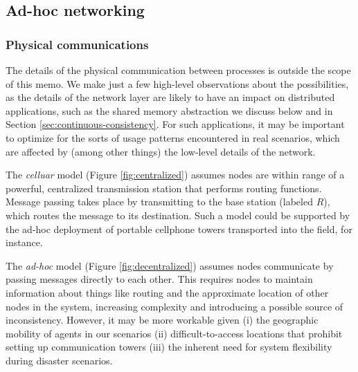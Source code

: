 \documentclass[]             %
{NASA}                       %
\theoremstyle{definition}
\begin{document}
\subsection{Ad-hoc networking}
\label{ad-hoc-networking}

\subsubsection{Physical communications}
\label{physical-communications}

The details of the physical communication between processes is outside
the scope of this memo. We make just a few high-level observations about
the possibilities, as the details of the network layer are likely to
have an impact on distributed applications, such as the shared memory
abstraction we discuss below and in Section
\ref{sec:continuous-consistency}. For such applications, it may be
important to optimize for the sorts of usage patterns encountered in
real scenarios, which are affected by (among other things) the low-level
details of the network.

The \emph{celluar} model (Figure \ref{fig:centralized}) assumes nodes
are within range of a powerful, centralized transmission station that
performs routing functions. Message passing takes place by transmitting
to the base station (labeled \(R\)), which routes the message to its
destination. Such a model could be supported by the ad-hoc deployment of
portable cellphone towers transported into the field, for instance.

The \emph{ad-hoc} model (Figure \ref{fig:decentralized}) assumes nodes
communicate by passing messages directly to each other. This requires
nodes to maintain information about things like routing and the
approximate location of other nodes in the system, increasing complexity
and introducing a possible source of inconsistency. However, it may be
more workable given (i) the geographic mobility of agents in our
scenarios (ii) difficult-to-access locations that prohibit setting up
communication towers (iii) the inherent need for system flexibility
during disaster scenarios.
\end{document}
